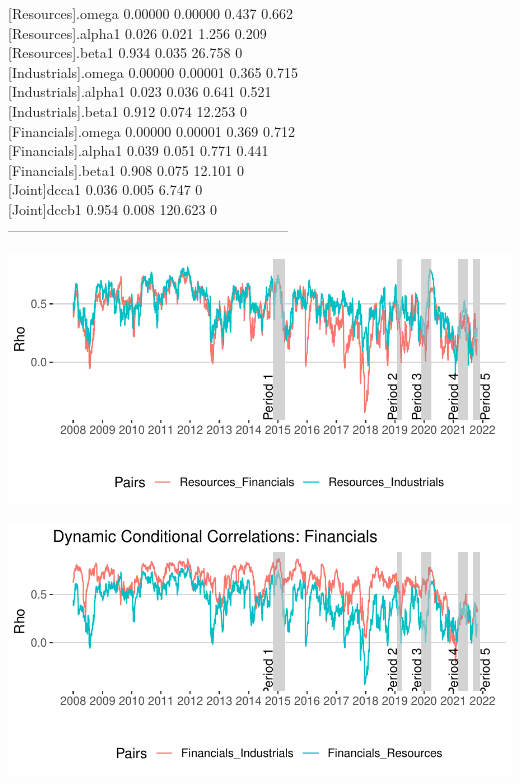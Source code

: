 \documentclass[11pt,preprint, authoryear]{elsarticle}
\let\origfigure\figure
\let\endorigfigure\endfigure
\renewenvironment{figure}[1][2] {
    \expandafter\origfigure\expandafter[H]
} {
    \endorigfigure
}
\numberwithin{equation}{section}
\numberwithin{figure}{section}
\numberwithin{table}{section}
\begin{document}
{[}Resources{]}.omega 0.00000 0.00000 0.437 0.662\\
{[}Resources{]}.alpha1 0.026 0.021 1.256 0.209\\
{[}Resources{]}.beta1 0.934 0.035 26.758 0\\
{[}Industrials{]}.omega 0.00000 0.00001 0.365 0.715\\
{[}Industrials{]}.alpha1 0.023 0.036 0.641 0.521\\
{[}Industrials{]}.beta1 0.912 0.074 12.253 0\\
{[}Financials{]}.omega 0.00000 0.00001 0.369 0.712\\
{[}Financials{]}.alpha1 0.039 0.051 0.771 0.441\\
{[}Financials{]}.beta1 0.908 0.075 12.101 0\\
{[}Joint{]}dcca1 0.036 0.005 6.747 0\\
{[}Joint{]}dccb1 0.954 0.008 120.623 0\\
------------------------------------------------------------

\begin{figure}[H]

{\centering \includegraphics{Paper_files/figure-latex/DCCfullr-1} 

}

\caption{Dynamic Conditional Correlations: Resources \label{DCCfullr}}\label{fig:DCCfullr}
\end{figure}

\begin{figure}[H]

{\centering \includegraphics{Paper_files/figure-latex/DCCfullf-1} 

}

\caption{Dynamic Conditional Correlations: Financials \label{DCCfullf}}\label{fig:DCCfullf}
\end{figure}
\end{document}
